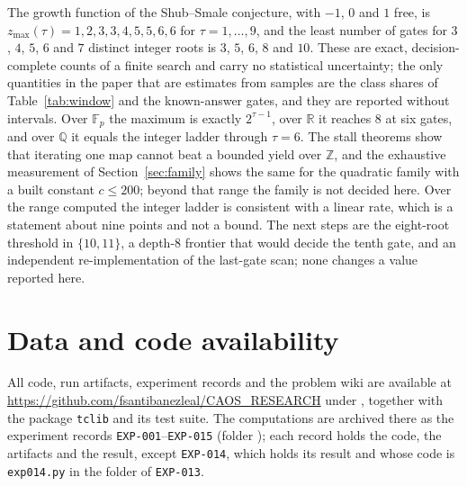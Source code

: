 \documentclass[11pt]{article}
\theoremstyle{definition}
\theoremstyle{remark}
\newcommand{\Z}{\mathbb{Z}}
\newcommand{\zmax}{z_{\max}}
\begin{document}
The growth function of the Shub--Smale conjecture, with $-1$, $0$ and $1$ free, is $\zmax(\tau) = 1,2,3,3,4,5,5,6,6$ for
$\tau = 1,\dots,9$, and the least number of gates for $3$, $4$, $5$, $6$ and $7$ distinct integer roots is
$3$, $5$, $6$, $8$ and $10$. These are exact, decision-complete counts of a finite search and carry no
statistical uncertainty; the only quantities in the paper that are estimates from samples are the class shares of
Table~\ref{tab:window} and the known-answer gates, and they are reported without intervals. Over $\mathbb{F}_p$ the maximum is
exactly $2^{\tau-1}$, over $\mathbb{R}$ it reaches $8$ at six gates, and over $\mathbb{Q}$ it equals the integer ladder
through $\tau = 6$. The stall theorems show that iterating one map cannot beat a bounded yield over $\Z$, and
the exhaustive measurement of Section~\ref{sec:family} shows the same for the quadratic family with a built constant
$c \le 200$; beyond that range the family is not decided here. Over the range computed the integer ladder is consistent with a linear rate, which is a statement about
nine points and not a bound. The next steps are the
eight-root threshold in $\{10,11\}$, a depth-$8$ frontier that would decide the tenth gate, and an
independent re-implementation of the last-gate scan; none changes a value reported here.

\section*{Data and code availability}

{\raggedright
All code, run artifacts, experiment records and the problem wiki are available at
\url{https://github.com/fsantibanezleal/CAOS_RESEARCH} under
, together with the package
\texttt{tclib} and its test suite. The computations are archived there as the
experiment records \texttt{EXP-001}--\texttt{EXP-015} (folder );
each record holds the code, the artifacts and the result, except \texttt{EXP-014}, which holds its result and
whose code is \texttt{exp014.py} in the folder of \texttt{EXP-013}.\par}
\end{document}
